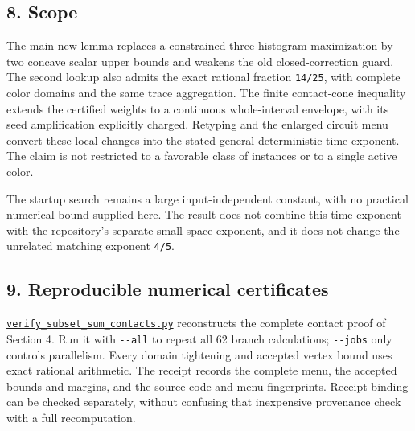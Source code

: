 \hypertarget{af-a9ec399514-scope}{%
\subsection{8. Scope}\label{af-a9ec399514-scope}}

The main new lemma replaces a constrained three-histogram maximization by two concave scalar upper bounds and weakens the old closed-correction guard. The second lookup also admits the exact rational fraction \texttt{14/25}, with complete color domains and the same trace aggregation. The finite contact-cone inequality extends the certified weights to a continuous whole-interval envelope, with its seed amplification explicitly charged. Retyping and the enlarged circuit menu convert these local changes into the stated general deterministic time exponent. The claim is not restricted to a favorable class of instances or to a single active color.

The startup search remains a large input-independent constant, with no practical numerical bound supplied here. The result does not combine this time exponent with the repository's separate small-space exponent, and it does not change the unrelated matching exponent \texttt{4/5}.

\hypertarget{af-a9ec399514-reproducible-numerical-certificates}{%
\subsection{9. Reproducible numerical certificates}\label{af-a9ec399514-reproducible-numerical-certificates}}

\href{https://github.com/icekylinx/algorithm-frontier/blob/main/tools/verify_subset_sum_contacts.py}{\texttt{verify\_subset\_sum\_contacts.py}} reconstructs the complete contact proof of Section 4. Run it with \texttt{-\/-all} to repeat all 62 branch calculations; \texttt{-\/-jobs} only controls parallelism. Every domain tightening and accepted vertex bound uses exact rational arithmetic. The \href{https://github.com/icekylinx/algorithm-frontier/blob/main/problems/subset-sum-fast-deterministic/verify/receipt.json}{receipt} records the complete menu, the accepted bounds and margins, and the source-code and menu fingerprints. Receipt binding can be checked separately, without confusing that inexpensive provenance check with a full recomputation.

